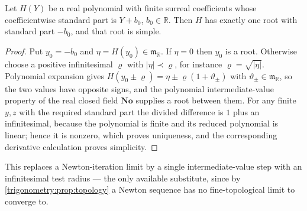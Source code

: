 \documentclass[11pt,letterpaper]{article}
\numberwithin{equation}{section}
\theoremstyle{definition}
\theoremstyle{remark}
\newcommand{\No}{\mathbf{No}}
\newcommand{\R}{\mathbb R}
\newcommand{\mm}{\mathfrak m}
\begin{document}
\begin{lemma}\label{trigonometry:lem:hensel}
Let $H(Y)$ be a real polynomial with finite surreal coefficients whose coefficientwise standard
part is $Y+b_0$, $b_0\in\R$. Then $H$ has exactly one root with standard part $-b_0$, and that
root is simple.
\end{lemma}
\begin{proof}
Put $y_0=-b_0$ and $\eta=H(y_0)\in\mm_{\R}$. If $\eta=0$ then $y_0$ is a root. Otherwise choose a
positive infinitesimal $\varrho$ with $|\eta|\prec\varrho$, for instance $\varrho=\sqrt{|\eta|}$.
Polynomial expansion gives $H(y_0\pm\varrho)=\eta\pm\varrho(1+\vartheta_\pm)$ with
$\vartheta_\pm\in\mm_{\R}$, so the two values have opposite signs, and the polynomial
intermediate-value property of the real closed field $\No$ supplies a root between them. For any
finite $y,z$ with the required standard part the divided difference is $1$ plus an infinitesimal,
because the polynomial is finite and its reduced polynomial is linear; hence it is nonzero, which
proves uniqueness, and the corresponding derivative calculation proves simplicity.
\end{proof}
This replaces a Newton-iteration limit by a single intermediate-value step with an infinitesimal
test radius --- the only available substitute, since by \cref{trigonometry:prop:topology} a
Newton sequence has no fine-topological limit to converge to.
\end{document}
